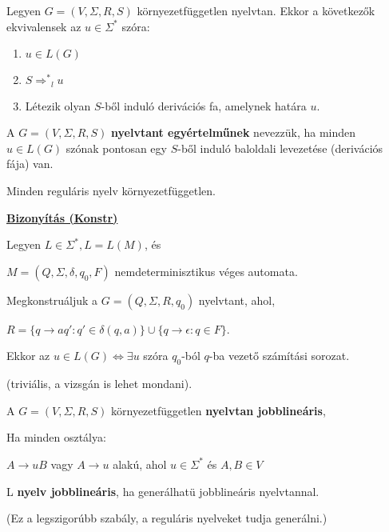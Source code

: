 \documentclass[10pt]{article}
\renewcommand{\\}{\par\noindent}
\begin{document}
\begin{frame}
\begin{tcolorbox}[title={Tétel: Ekvivalens állítások derivációs fákra}]
Legyen $G = (V, {\Sigma}, R, S)$ környezetfüggetlen nyelvtan. Ekkor a következők ekvivalensek az $u \in {\Sigma}^*$ szóra:\\
\begin{enumerate}
\item $u \in L(G)$
\item $S {{\Rightarrow}^*}_l u$
\item Létezik olyan $S$-ből induló derivációs fa, amelynek határa $u$.
\end{enumerate}
\end{tcolorbox}

\end{frame}

\begin{frame}
\begin{tcolorbox}[title={Egyértelmű nyelvtan}]
A $G = (V, {\Sigma}, R, S)$ \textbf{nyelvtant egyértelműnek} nevezzük, ha minden $u \in L(G)$ szónak pontosan egy $S$-ből induló baloldali levezetése (derivációs fája) van.
\end{tcolorbox}
\end{frame}

\begin{frame}
\begin{tcolorbox}[title={Tétel: Reguláris nyelv környezetfüggetlen}]
Minden reguláris nyelv környezetfüggetlen.\\
\tcblower
\smallskip
\underline{\textbf{Bizonyítás (Konstr)}}\\
\medskip
Legyen $L \in {\Sigma}^*, L = L(M)$, és\\
$M = (Q, {\Sigma}, {\delta}, q_0, F)$ nemdeterminisztikus véges automata.\\
\bigskip
Megkonstruáljuk a $G = (Q, {\Sigma}, R, q_0)$ nyelvtant, ahol,\\
$R = \{q \rightarrow aq' : q' \in {\delta}(q, a)\} \cup \{q \rightarrow \epsilon : q \in F \}$.\\
Ekkor az $u \in  L(G) \iff \exists u$ szóra $q_0$-ból $q$-ba vezető számítási sorozat.\\
(triviális, a vizsgán is lehet mondani).
\end{tcolorbox}

\end{frame}

\begin{frame}
\begin{tcolorbox}[title={Jobblineáris nyelvtan, nyelv}]
A $G = (V, {\Sigma}, R, S)$ környezetfüggetlen \textbf{nyelvtan jobblineáris},\\
Ha minden osztálya:\\
\medskip
$A \rightarrow uB$ vagy $A \rightarrow u$ alakú, ahol $u \in {\Sigma}^*$ és $A, B \in V$\\
\bigskip
L \textbf{nyelv jobblineáris}, ha generálhatü jobblineáris nyelvtannal.\\
\smallskip
(Ez a legszigorúbb szabály, a reguláris nyelveket tudja generálni.)
\end{tcolorbox}
\end{frame}
\end{document}
